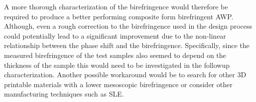 A more thorough characterization of the birefringence would therefore be required to produce a better performing composite form birefringent AWP. Although, even a rough correction to the birefringence used in the design process could potentially lead to a significant improvement due to the non-linear relationship between the phase shift and the birefringence. Specifically, since the measured birefringence of the test samples also seemed to depend on the thickness of the sample this would need to be investigated in the followup characterization. Another possible workaround would be to search for other 3D printable materials with a lower mesoscopic birefringence or consider other manufacturing techniques such as SLE. 



